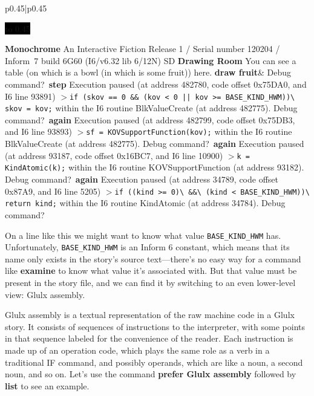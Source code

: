 \documentclass{book}
\newcommand{\n}{\hspace*{\fill}\newline}
\newcommand{\terp}[2]{\begin{center}\begin{tabular}{p{0.45\textwidth}|p{0.45\textwidth}}\midrule #1&#2\\\midrule\end{tabular}\end{center}}
\newcommand{\glkheading}[1]{\textbf{#1}}
\newcommand{\glkinput}[1]{\textbf{#1}}
\newcommand{\glkstatusline}[2]{\centerline{\colorbox{black}{\hbox to 0.45\textwidth{\textcolor{white}{#1\hfil #2}}}}}
\newcommand{\storyprompt}{\raisebox{1.5pt}{\(>\)}}
\newcommand{\cursor}{\raisebox{-1.5pt}{\RectangleThin}}
\newcommand{\markedindent}{\(>\)\qquad}
\begin{document}
\terp{\glkstatusline{Drawing Room}{0/1}\n
  \glkheading{Monochrome}\n
  An Interactive Fiction\n
  Release 1 / Serial number 120204 / Inform~7 build 6G60 (I6/v6.32 lib 6/12N) SD\n
  \n
  \glkheading{Drawing Room}\n
  You can see a table (on which is a bowl (in which is some fruit)) here.\n
  \n
  \storyprompt\glkinput{draw fruit}}{%
  Debug command?\ \glkinput{step}\n
  \n
  Execution paused (at address 482780, code offset 0x75DA0, and I6 line 93891)\n
  \markedindent \lstinline{if (skov == 0 && (kov < 0 || kov >= BASE_KIND_HWM))}\lstinline{\ skov = kov;}\n
  within the I6 routine BlkValueCreate (at address 482775).\n
  \n
  Debug command?\ \glkinput{again}\n
  \n
  Execution paused (at address 482799, code offset 0x75DB3, and I6 line 93893)\n
  \markedindent \lstinline{sf = KOVSupportFunction(kov);}\n
  within the I6 routine BlkValueCreate (at address 482775).\n
  \n
  Debug command?\ \glkinput{again}\n
  \n
  Execution paused (at address 93187, code offset 0x16BC7, and I6 line 10900)\n
  \markedindent \lstinline{k = KindAtomic(k);}\n
  within the I6 routine KOVSupportFunction (at address 93182).\n
  \n
  Debug command?\ \glkinput{again}\n
  \n
  Execution paused (at address 34789, code offset 0x87A9, and I6 line 5205)\n
  \markedindent \lstinline{if ((kind >= 0)}\lstinline{\ &&}\lstinline{\ (kind < BASE_KIND_HWM))}\lstinline{\ return kind;}\n
  within the I6 routine KindAtomic (at address 34784).\n
  \n
  Debug command?\ \cursor}

On a line like this we might want to know what value \lstinline{BASE_KIND_HWM}
has.  Unfortunately, \lstinline{BASE_KIND_HWM} is an Inform 6 constant, which
means that its name only exists in the story's source text---there's no easy way
for a command like \glkinput{examine} to know what value it's associated with.
But that value must be present in the story file, and we can find it by
switching to an even lower-level view: Glulx assembly.

\label{glulx-format}
Glulx assembly is a textual representation of the raw machine code in a Glulx
story.  It consists of sequences of instructions to the interpreter, with some
points in that sequence labeled for the convenience of the reader.  Each
instruction is made up of an operation code, which plays the same role as a verb
in a traditional IF command, and possibly operands, which are like a noun, a
second noun, and so on.  Let's use the command \glkinput{prefer Glulx assembly}
followed by \glkinput{list} to see an example.
\end{document}
